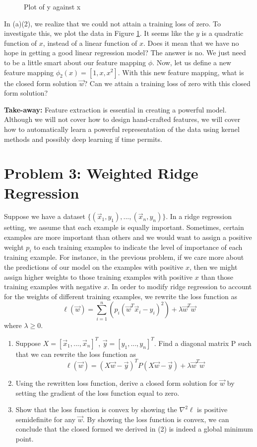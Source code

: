 \documentclass{article}
\begin{document}
\begin{enumerate}[(1)]
\begin{figure}[h!]
		\caption{Plot of y against x}
		\label{fig:data}
	\end{figure}
	In (a)(2), we realize that we could not attain a training loss of zero. To investigate this, we plot the data in Figure \ref{fig:data}. It seems like the $y$ is a quadratic function of $x$, instead of a linear function of $x$. Does it mean that we have no hope in getting a good linear regression model? The answer is no. We just need to be a little smart about our feature mapping $\phi$. Now, let us define a new feature mapping $\phi_2(x) = [1, x, x^2]$. With this new feature mapping, what is the closed form solution $\vec{w}$? Can we attain a training loss of zero with this closed form solution?
	
\end{enumerate}
\textbf{Take-away:} Feature extraction is essential in creating a powerful model. Although we will not cover how to design hand-crafted features, we will cover how to automatically learn a powerful representation of the data using kernel methods and possibly deep learning if time permits. 

\section*{Problem 3: Weighted Ridge Regression}
Suppose we have a dataset $\{(\vec{x}_1, y_1), ..., (\vec{x}_n, y_n)\}$. In a ridge regression setting, we assume that each example is equally important. Sometimes, certain examples are more important than others and we would want to assign a positive weight $p_i$ to each training examples to indicate the level of importance of each training example. For instance, in the previous problem, if we care more about the predictions of our model on the examples with positive $x$, then we might assign higher weights to those training examples with positive $x$ than those training examples with negative $x$. 
\newline
\newline
In order to modify ridge regression to account for the weights of different training examples, we rewrite the loss function as 
$$\ell(\vec{w}) = \sum_{i = 1}^{n}(p_i(\vec{w}^T\vec{x}_i - y_i)^2) + \lambda \vec{w}^T \vec{w}$$ where $\lambda \geq 0$.
\begin{enumerate}
	\item Suppose $X = [\vec{x}_1, ..., \vec{x}_n]^T$, $\vec{y} = [y_1, ..., y_n]^T$. Find a diagonal matrix P such that we can rewrite the loss function as $$\ell(\vec{w}) =  (X\vec{w} - \vec{y})^TP(X\vec{w} - \vec{y}) + \lambda \vec{w}^T \vec{w}$$
	\item Using the rewritten loss function, derive a closed form solution for $\vec{w}$ by setting the gradient of the loss function equal to zero. 
	\item Show that the loss function is convex by showing the $\nabla^2 \ell$ is positive semidefinite for any $\vec{w}$. By showing the loss function is convex, we can conclude that the closed formed we derived in (2) is indeed a global minimum point.  
\end{enumerate} 
\end{document}
